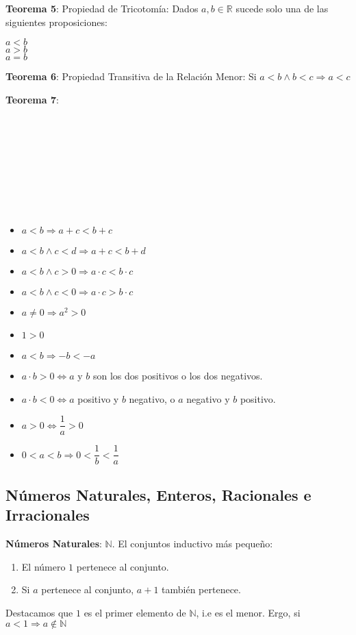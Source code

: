 \documentclass[11pt,a4paper]{article}
\begin{document}
\noindent \textbf{Teorema 5}: Propiedad de Tricotom\'ia: Dados $a,b \in \mathbb{R}$ sucede solo una de las siguientes proposiciones:
\begin{multicols}{3}
$a < b$\\
$a > b$\\
$a = b$
\end{multicols}
\noindent \textbf{Teorema 6}: Propiedad Transitiva de la Relaci\'on Menor: Si $a < b \land b < c \Rightarrow a < c$
\vspace{-0.4cm}
\begin{multicols}{3}
\noindent \textbf{Teorema 7}:\\ \\ \\ \\ \\ \\ \\ \\ \\

\begin{itemize}
\item $a < b \Rightarrow a + c < b + c$
\item $a < b \land c < d \Rightarrow a + c < b + d$
\item $a < b \land c > 0 \Rightarrow a \cdot c < b \cdot c$
\item $a < b \land c < 0 \Rightarrow a \cdot c > b \cdot c$
\item $a \not = 0 \Rightarrow a^2 > 0$
\item $1 > 0$
\item $a < b \Rightarrow -b < -a$
\item $a \cdot b > 0 \iff a$ y $b$ son los dos positivos o los dos negativos.
\item $a \cdot b < 0 \iff a$ positivo y $b$ negativo, o $a$ negativo y $b$ positivo.
\item $a > 0 \iff \dfrac{1}{a} > 0$
\item $0 < a < b \Rightarrow 0 < \dfrac{1}{b} < \dfrac{1}{a}$
\end{itemize}
\end{multicols}

\subsection{N\'umeros Naturales, Enteros, Racionales e Irracionales}
\noindent \textbf{N\'umeros Naturales}: $\mathbb{N}$. El conjuntos inductivo m\'as peque\~{n}o:
\begin{enumerate}
\item El n\'umero $1$ pertenece al conjunto.
\item Si $a$ pertenece al conjunto, $a+1$ tambi\'en pertenece.
\end{enumerate}
\indent Destacamos que $1$ es el primer elemento de $\mathbb{N}$, i.e es el menor. Ergo, si $a < 1 \Rightarrow a \not \in \mathbb{N}$ \\
\end{document}
